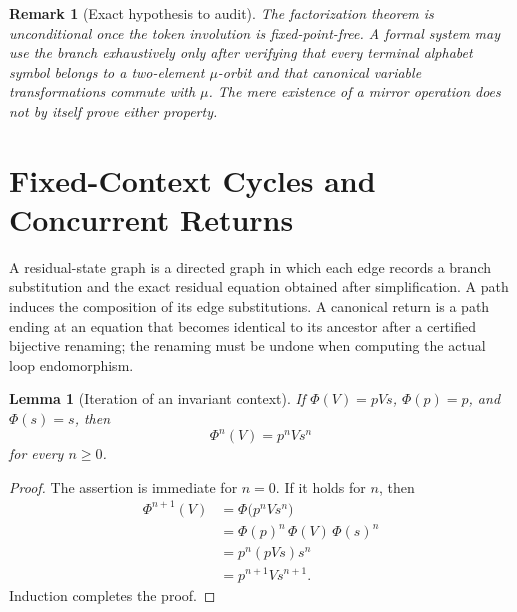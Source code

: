 \documentclass[11pt]{article}
\newtheorem{lemma}[theorem]{Lemma}
\newtheorem{remark}[theorem]{Remark}
\begin{document}
\begin{remark}[Exact hypothesis to audit]
The factorization theorem is unconditional once the token involution is fixed-point-free. A formal system may use the branch exhaustively only after verifying that every terminal alphabet symbol belongs to a two-element $\mu$-orbit and that canonical variable transformations commute with $\mu$. The mere existence of a mirror operation does not by itself prove either property.
\end{remark}

\section{Fixed-Context Cycles and Concurrent Returns}

A residual-state graph is a directed graph in which each edge records a branch substitution and the exact residual equation obtained after simplification. A path induces the composition of its edge substitutions. A canonical return is a path ending at an equation that becomes identical to its ancestor after a certified bijective renaming; the renaming must be undone when computing the actual loop endomorphism.

\begin{lemma}[Iteration of an invariant context]\label{lem:iterate}
If $\Phi(V)=pVs$, $\Phi(p)=p$, and $\Phi(s)=s$, then
\[
  \Phi^n(V)=p^nVs^n
\]
for every $n\ge0$.
\end{lemma}

\begin{proof}
The assertion is immediate for $n=0$. If it holds for $n$, then
\[
\begin{aligned}
\Phi^{n+1}(V)
  &=\Phi\bigl(p^nVs^n\bigr)\\
  &=\Phi(p)^n\,\Phi(V)\,\Phi(s)^n\\
  &=p^n(pVs)s^n\\
  &=p^{n+1}Vs^{n+1}.
\end{aligned}
\]
Induction completes the proof.
\end{proof}
\end{document}
